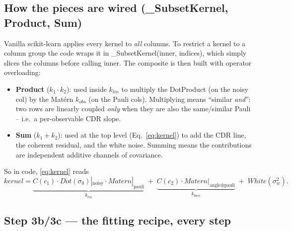 \documentclass[11pt]{article}
\def\texttt#1{#1}%
\def\mathrm#1{#1}%
\begin{document}
\subsection{How the pieces are wired (\texttt{\_SubsetKernel}, Product, Sum)}
Vanilla scikit-learn applies every kernel to \emph{all} columns. To restrict a
kernel to a column group the code wraps it in \texttt{\_SubsetKernel(inner,
indices)}, which simply slices the columns before calling \texttt{inner}. The
composite is then built with operator overloading:
\begin{itemize}
\item \textbf{Product} ($k_1\!\cdot\!k_2$): used inside $k_{\mathrm{lin}}$ to
      multiply the DotProduct (on the noisy col) by the Mat\'ern $k_{\mathrm{obs}}$
      (on the Pauli cols). Multiplying means ``similar \emph{and}'': two rows are
      linearly coupled \emph{only} when they are also the same/similar Pauli --
      i.e.\ a per-observable CDR slope.
\item \textbf{Sum} ($k_1\!+\!k_2$): used at the top level
      (Eq.~\eqref{eq:kernel}) to add the CDR line, the coherent residual, and the
      white noise. Summing means the contributions are independent additive
      channels of covariance.
\end{itemize}
So in code, \eqref{eq:kernel} reads
\[
\texttt{kernel}=\underbrace{C(c_1)\!\cdot\!\mathrm{Dot}(\sigma_0)|_{\text{noisy}}\!\cdot\!\mathrm{Matern}|_{\text{pauli}}}_{k_{\mathrm{lin}}}
\;+\;\underbrace{C(c_2)\!\cdot\!\mathrm{Matern}|_{\text{angle}\oplus\text{pauli}}}_{k_{\mathrm{base}}}
\;+\;\mathrm{White}(\sigma_w^2).
\]

\subsection{Step 3b/3c --- the fitting recipe, every step}
\label{sec:fit}
\end{document}
